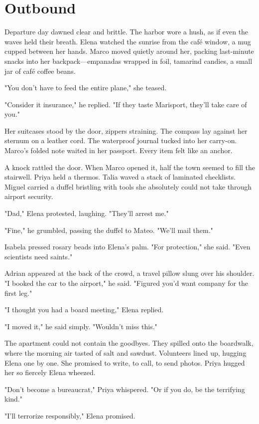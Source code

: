 \chapter{Outbound}

Departure day dawned clear and brittle. The harbor wore a hush, as if even the waves held their breath. Elena watched the sunrise from the café window, a mug cupped between her hands. Marco moved quietly around her, packing last-minute snacks into her backpack—empanadas wrapped in foil, tamarind candies, a small jar of café coffee beans.

"You don't have to feed the entire plane," she teased.

"Consider it insurance," he replied. "If they taste Marisport, they'll take care of you."

Her suitcases stood by the door, zippers straining. The compass lay against her sternum on a leather cord. The waterproof journal tucked into her carry-on. Marco's folded note waited in her passport. Every item felt like an anchor.

A knock rattled the door. When Marco opened it, half the town seemed to fill the stairwell. Priya held a thermos. Talia waved a stack of laminated checklists. Miguel carried a duffel bristling with tools she absolutely could not take through airport security.

"Dad," Elena protested, laughing. "They'll arrest me."

"Fine," he grumbled, passing the duffel to Mateo. "We'll mail them."

Isabela pressed rosary beads into Elena's palm. "For protection," she said. "Even scientists need saints."

Adrian appeared at the back of the crowd, a travel pillow slung over his shoulder. "I booked the car to the airport," he said. "Figured you'd want company for the first leg."

"I thought you had a board meeting," Elena replied.

"I moved it," he said simply. "Wouldn't miss this."

The apartment could not contain the goodbyes. They spilled onto the boardwalk, where the morning air tasted of salt and sawdust. Volunteers lined up, hugging Elena one by one. She promised to write, to call, to send photos. Priya hugged her so fiercely Elena wheezed.

"Don't become a bureaucrat," Priya whispered. "Or if you do, be the terrifying kind."

"I'll terrorize responsibly," Elena promised.

